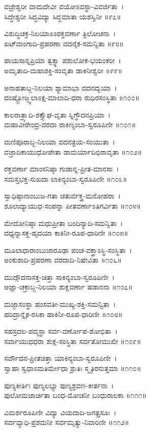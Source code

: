 ವಜ್ರೇಶ್ವರೀ ವಾಮದೇವೀ ವಯೋಽವಸ್ಥಾ-ವಿವರ್ಜಿತಾ~।\\
ಸಿದ್ಧೇಶ್ವರೀ ಸಿದ್ಧವಿದ್ಯಾ ಸಿದ್ಧಮಾತಾ ಯಶಸ್ವಿನೀ ॥೯೭॥

ವಿಶುದ್ಧಿಚಕ್ರ-ನಿಲಯಾಽಽರಕ್ತವರ್ಣಾ ತ್ರಿಲೋಚನಾ~।\\
ಖಟ್‍ವಾಂಗಾದಿ-ಪ್ರಹರಣಾ ವದನೈಕ-ಸಮನ್ವಿತಾ ॥೯೮॥

ಪಾಯಸಾನ್ನಪ್ರಿಯಾ ತ್ವಕ್ಸ್ಥಾ ಪಶುಲೋಕ-ಭಯಂಕರೀ~।\\
ಅಮೃತಾದಿ-ಮಹಾಶಕ್ತಿ-ಸಂವೃತಾ ಡಾಕಿನೀಶ್ವರೀ ॥೯೯॥

ಅನಾಹತಾಬ್ಜ-ನಿಲಯಾ ಶ್ಯಾಮಾಭಾ ವದನದ್ವಯಾ~।\\
ದಂಷ್ಟ್ರೋಜ್ಜ್ವಲಾಽಕ್ಷ-ಮಾಲಾದಿ-ಧರಾ ರುಧಿರಸಂಸ್ಥಿತಾ ॥೧೦೦॥

ಕಾಲರಾತ್ರ್ಯಾದಿ-ಶಕ್ತ್ಯೌಘ-ವೃತಾ ಸ್ನಿಗ್ಧೌದನಪ್ರಿಯಾ~।\\
ಮಹಾವೀರೇಂದ್ರ-ವರದಾ ರಾಕಿಣ್ಯಂಬಾ-ಸ್ವರೂಪಿಣೀ ॥೧೦೧॥

ಮಣಿಪೂರಾಬ್ಜ-ನಿಲಯಾ ವದನತ್ರಯ-ಸಂಯುತಾ~।\\
ವಜ್ರಾದಿಕಾಯುಧೋಪೇತಾ ಡಾಮರ್ಯಾದಿಭಿರಾವೃತಾ ॥೧೦೨॥

ರಕ್ತವರ್ಣಾ ಮಾಂಸನಿಷ್ಠಾ  ಗುಡಾನ್ನ-ಪ್ರೀತ-ಮಾನಸಾ~।\\
ಸಮಸ್ತಭಕ್ತ-ಸುಖದಾ ಲಾಕಿನ್ಯಂಬಾ-ಸ್ವರೂಪಿಣೀ ॥೧೦೩॥

ಸ್ವಾಧಿಷ್ಠಾನಾಂಬುಜ-ಗತಾ ಚತುರ್ವಕ್ತ್ರ-ಮನೋಹರಾ~।\\
ಶೂಲಾದ್ಯಾಯುಧ-ಸಂಪನ್ನಾ ಪೀತವರ್ಣಾಽತಿಗರ್ವಿತಾ ॥೧೦೪॥

ಮೇದೋನಿಷ್ಠಾ ಮಧುಪ್ರೀತಾ ಬಂದಿನ್ಯಾದಿ-ಸಮನ್ವಿತಾ~।\\
ದಧ್ಯನ್ನಾಸಕ್ತ-ಹೃದಯಾ ಕಾಕಿನೀ-ರೂಪ-ಧಾರಿಣೀ ॥೧೦೫॥

ಮೂಲಾಧಾರಾಂಬುಜಾರೂಢಾ ಪಂಚ-ವಕ್ತ್ರಾಽಸ್ಥಿ-ಸಂಸ್ಥಿತಾ~।\\
ಅಂಕುಶಾದಿ-ಪ್ರಹರಣಾ ವರದಾದಿ-ನಿಷೇವಿತಾ ॥೧೦೬॥

ಮುದ್ಗೌದನಾಸಕ್ತ-ಚಿತ್ತಾ ಸಾಕಿನ್ಯಂಬಾ-ಸ್ವರೂಪಿಣೀ~।\\
ಆಜ್ಞಾ-ಚಕ್ರಾಬ್ಜ-ನಿಲಯಾ ಶುಕ್ಲವರ್ಣಾ ಷಡಾನನಾ ॥೧೦೭॥

ಮಜ್ಜಾಸಂಸ್ಥಾ ಹಂಸವತೀ-ಮುಖ್ಯ-ಶಕ್ತಿ-ಸಮನ್ವಿತಾ~।\\
ಹರಿದ್ರಾನ್ನೈಕ-ರಸಿಕಾ ಹಾಕಿನೀ-ರೂಪ-ಧಾರಿಣೀ ॥೧೦೮॥

ಸಹಸ್ರದಲ-ಪದ್ಮಸ್ಥಾ ಸರ್ವ-ವರ್ಣೋಪ-ಶೋಭಿತಾ~।\\
ಸರ್ವಾಯುಧಧರಾ ಶುಕ್ಲ-ಸಂಸ್ಥಿತಾ ಸರ್ವತೋಮುಖೀ ॥೧೦೯॥

ಸರ್ವೌದನ-ಪ್ರೀತಚಿತ್ತಾ ಯಾಕಿನ್ಯಂಬಾ-ಸ್ವರೂಪಿಣೀ~।\\
ಸ್ವಾಹಾ ಸ್ವಧಾಽಮತಿರ್ಮೇಧಾ ಶ್ರುತಿಃ ಸ್ಮೃತಿರನುತ್ತಮಾ ॥೧೧೦॥

ಪುಣ್ಯಕೀರ್ತಿಃ ಪುಣ್ಯಲಭ್ಯಾ ಪುಣ್ಯಶ್ರವಣ-ಕೀರ್ತನಾ~।\\
ಪುಲೋಮಜಾರ್ಚಿತಾ ಬಂಧ-ಮೋಚನೀ ಬಂಧುರಾಲಕಾ ॥೧೧೧॥

ವಿಮರ್ಶರೂಪಿಣೀ ವಿದ್ಯಾ ವಿಯದಾದಿ-ಜಗತ್ಪ್ರಸೂಃ~।\\
ಸರ್ವವ್ಯಾಧಿ-ಪ್ರಶಮನೀ ಸರ್ವಮೃತ್ಯು-ನಿವಾರಿಣೀ ॥೧೧೨॥

